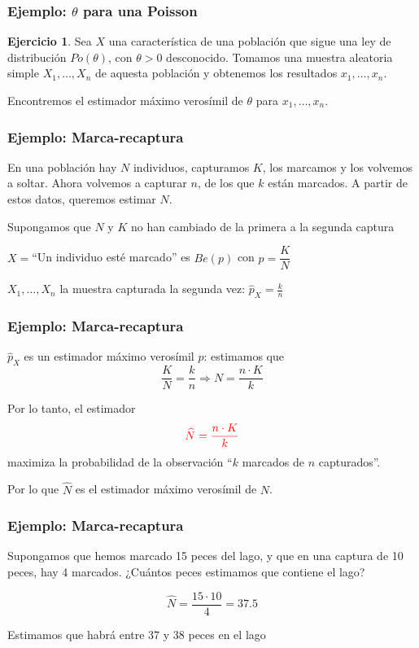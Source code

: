 \documentclass[12pt,t]{beamer}\usepackage[]{graphicx}\usepackage[]{color}
\newcommand{\red}[1]{\textcolor{red}{#1}}
\renewcommand{\emph}[1]{{\color{red}#1}}
\theoremstyle{plain}
\theoremstyle{definition}
\newtheorem{exerc}{Ejercicio}
\begin{document}
\begin{frame}
\frametitle{Ejemplo: $\theta$ para  una Poisson}

\vspace{1cm}

\begin{exerc}
Sea $X$ una característica de una población que sigue una ley de distribución $Po(\theta)$, con $\theta>0$ desconocido. Tomamos  una muestra aleatoria   simple $X_1,\ldots,X_n$ de aquesta población y obtenemos los resultados $x_1,\ldots,x_n$. 

\medskip

Encontremos el estimador máximo verosímil  de $\theta$ para  $x_1,\ldots,x_n$.
\end{exerc}

\end{frame}



\begin{frame}
\frametitle{Ejemplo: Marca-recaptura}

En una población hay $N$ individuos, capturamos $K$, los marcamos y los  volvemos a soltar.  Ahora volvemos a capturar $n$, de los que   $k$ están marcados. A partir de estos datos, queremos estimar $N$.
\bigskip

Supongamos  que $N$ y $K$ no han cambiado de la primera a la segunda captura
\bigskip

$X=$``Un individuo esté marcado'' es $Be(p)$ con $p=\dfrac{K}{N}$
\bigskip

$X_1,\ldots,X_n$ la muestra capturada la segunda vez: $\widehat{p}_X=\frac{k}{n}$

\end{frame}


\begin{frame}
\frametitle{Ejemplo: Marca-recaptura}

$\widehat{p}_X$ es un estimador máximo verosímil $p$: estimamos que
$$
\dfrac{K}{N}=\dfrac{k}{n}\Rightarrow N=\frac{n\cdot K}{k}
$$

Por lo tanto, el estimador
$$
\red{\widehat{N}=\frac{n\cdot K}{k}}
$$
 maximiza  la probabilidad  de la observación ``$k$ marcados de $n$ capturados''. 

\bigskip

Por lo que $\hat{N}$ es el \emph{estimador máximo verosímil} de $N$.

\end{frame}

\begin{frame}
\frametitle{Ejemplo: Marca-recaptura}

Supongamos que hemos marcado 15 peces del lago, y que en una captura de 10 peces, hay  4 marcados. ¿Cuántos peces estimamos  que contiene el lago?
\medskip

$$
\widehat{N}=\frac{15\cdot 10}{4}=37.5
$$

Estimamos que habrá entre 37 y 38 peces en el  lago

\end{frame}
\end{document}
